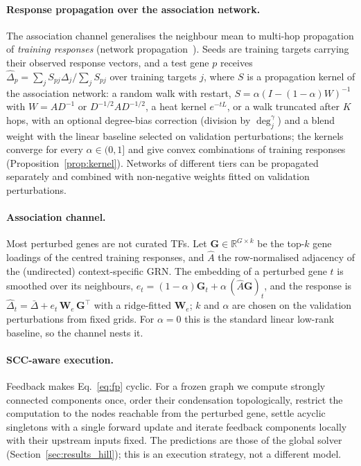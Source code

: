 \paragraph{Response propagation over the association network.}
The association channel generalises the neighbour mean to multi-hop propagation of \emph{training responses} (network propagation~\cite{cowen2017network}). Seeds are training targets carrying their observed response vectors, and a test gene $p$ receives $\hat\Delta_p=\sum_jS_{pj}\Delta_j/\sum_jS_{pj}$ over training targets $j$, where $S$ is a propagation kernel of the association network: a random walk with restart, $S=\alpha(I-(1-\alpha)W)^{-1}$ with $W=AD^{-1}$ or $D^{-1/2}AD^{-1/2}$, a heat kernel $e^{-tL}$, or a walk truncated after $K$ hops, with an optional degree-bias correction (division by $\deg_j^{\gamma}$) and a blend weight with the linear baseline selected on validation perturbations; the kernels converge for every $\alpha\in(0,1]$ and give convex combinations of training responses (Proposition~\ref{prop:kernel}). Networks of different tiers can be propagated separately and combined with non-negative weights fitted on validation perturbations.

\paragraph{Association channel.}
Most perturbed genes are not curated TFs. Let $\mathbf G\in\mathbb{R}^{G\times k}$ be the top-$k$ gene loadings of the centred training responses, and $\hat A$ the row-normalised adjacency of the (undirected) context-specific GRN. The embedding of a perturbed gene $t$ is smoothed over its neighbours, $e_t=(1-\alpha)\mathbf G_t+\alpha\,(\hat A\mathbf G)_t$, and the response is $\hat\Delta_t=\bar\Delta+e_t\,\mathbf W_e\,\mathbf G^\top$ with a ridge-fitted $\mathbf W_e$; $k$ and $\alpha$ are chosen on the validation perturbations from fixed grids. For $\alpha=0$ this is the standard linear low-rank baseline, so the channel nests it.

\paragraph{SCC-aware execution.}
Feedback makes Eq.~\eqref{eq:fp} cyclic. For a frozen graph we compute strongly connected components once, order their condensation topologically, restrict the computation to the nodes reachable from the perturbed gene, settle acyclic singletons with a single forward update and iterate feedback components locally with their upstream inputs fixed. The predictions are those of the global solver (Section~\ref{sec:results_hill}); this is an execution strategy, not a different model.

